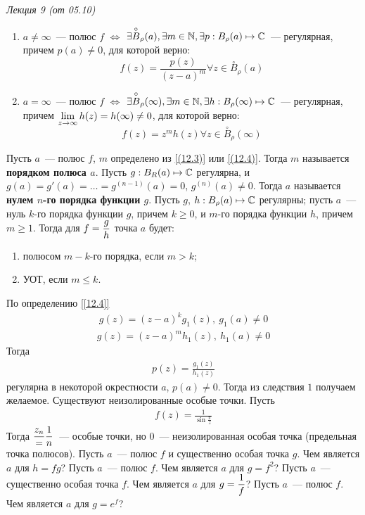 \begin{flushright}
    \textit{Лекция 9 (от 05.10)}
\end{flushright}
\corollary
\begin{enumerate}
    \item $a \neq \infty$~--- полюс $f$ $\Leftrightarrow$ $\exists
    \overset{\circ}{B}_{\rho}(a), \exists m \in \mathbb{N}, \exists p: B_{\rho}(a)
    \mapsto \mathbb{C}$~--- регулярная, причем $p(a) \neq 0$, для которой верно:
    \begin{equation}\label{(12.3)}
        f(z) = \frac{p(z)}{(z-a)^m} \forall z \in \overset{\circ}{B}_\rho(a)
    \end{equation}
    \item $a = \infty$~--- полюс $f$ $\Leftrightarrow$ $\exists
    \overset{\circ}{B}_{\rho}(\infty), \exists m \in \mathbb{N}, \exists h:
    B_{\rho}(\infty) \mapsto \mathbb{C}$~--- регулярная, причем $\displaystyle\lim_{z \to
      \infty} h(z) = h(\infty) \neq 0$, для которой верно:
    \begin{equation}\label{(12.4)}
        f(z) = z^mh(z) \forall z \in \overset{\circ}{B}_\rho(\infty)
    \end{equation}
\end{enumerate}
\Def \label{[12.3]}
Пусть $a$~--- полюс $f$, $m$ определено из \eqref{(12.3)} или
\eqref{(12.4)}. Тогда $m$ называется \textbf{порядком полюса $a$}.
\Def \label{[12.4]}
Пусть $g: B_R(a) \mapsto \mathbb{C}$ регулярна, и $g(a) = g'(a) = \dots = g^{(n-1)}(a)
= 0$, $g^{(n)}(a)\neq 0$. Тогда $a$ называется \textbf{нулем $n$-го порядка
  функции $g$}.
\corollary
Пусть $g$, $h: B_\rho(a) \mapsto \mathbb{C}$ регулярны; пусть $a$~--- нуль $k$-го
порядка функции $g$, причем $k \geq 0$, и $m$-го порядка функции $h$, причем $m
\geq 1$. Тогда для $f = \displaystyle \frac{g}{h}$ точка $a$ будет:
\begin{enumerate}
    \item полюсом $m-k$-го порядка, если $m > k$;
    \item УОТ, если $m \leq k$.
\end{enumerate}
\pr
По определению \ref{[12.4]}
\begin{align*}
  g(z) = (z-a)^kg_1(z), \ g_1(a) \neq 0
\end{align*}
\begin{align*}
  g(z) = (z-a)^mh_1(z), \ h_1(a) \neq 0
\end{align*}
Тогда
\begin{align*}
  p(z) = \frac{g_1(z)}{h_1(z)}
\end{align*}
регулярна в некоторой окрестности $a$, $p(a) \neq 0$. Тогда из следствия $1$
получаем желаемое.
\note
Существуют неизолированные особые точки. Пусть
\begin{align*}
  f(z) = \frac{1}{\sin \frac{\pi}{z}}
\end{align*}
Тогда $\displaystyle \frac{z_n} = \frac{1}{n}$~--- особые точки, но $0$~---
неизолированная особая точка (предельная точка полюсов).
\Exse
Пусть $a$~--- полюс $f$ и существенно особая точка $g$. Чем является $a$ для $h
= fg$?
\Exse
Пусть $a$~--- полюс $f$. Чем является $a$ для $g= f^2$?
\Exse
Пусть $a$~--- существенно особая точка $f$. Чем является $a$ для $g = \displaystyle
\frac{1}{f}$?
\Exse
Пусть $a$~--- полюс $f$. Чем является $a$ для $g = e^f$?
